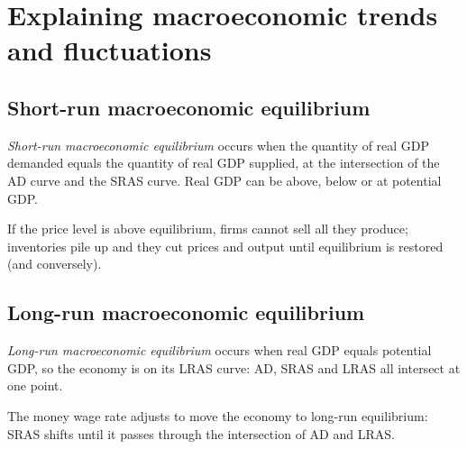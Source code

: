 \section{Explaining macroeconomic trends and fluctuations}

\subsection{Short-run macroeconomic equilibrium}

\begin{definition}
\emph{Short-run macroeconomic equilibrium} occurs when the quantity of real GDP demanded
equals the quantity of real GDP supplied, at the intersection of the AD curve and the SRAS
curve. Real GDP can be above, below or at potential GDP.
\end{definition}

If the price level is above equilibrium, firms cannot sell all they produce; inventories
pile up and they cut prices and output until equilibrium is restored (and conversely).

\subsection{Long-run macroeconomic equilibrium}

\begin{definition}
\emph{Long-run macroeconomic equilibrium} occurs when real GDP equals potential GDP, so
the economy is on its LRAS curve: AD, SRAS and LRAS all intersect at one point.
\end{definition}

The money wage rate adjusts to move the economy to long-run equilibrium: SRAS shifts until
it passes through the intersection of AD and LRAS.

\begin{center}
\end{center}

